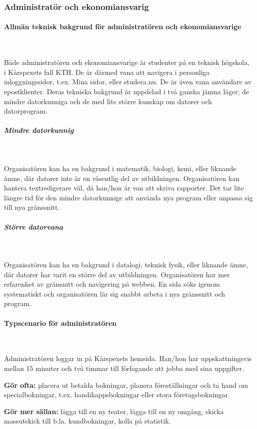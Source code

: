 \documentclass[a4paper, twoside, 11pt, titlepage]{article}
\begin{document}
		\subsubsection{Administratör och ekonomiansvarig}



			\paragraph{Allmän teknisk bakgrund för administratören och ekonomiansvarige}\

			Både administratören och ekonomiansvarige är studenter på en teknisk högskola, i Kårspexets fall KTH. De är därmed vana att navigera i personliga inloggningssidor, t.ex. Mina sidor, eller studera.nu. De är även vana användare av epostklienter. Deras tekniska bakgrund är uppdelad i två ganska jämna läger; de mindre datorkunniga och de med lite större kunskap om datorer och datorprogram.

			\subparagraph{\emph{Mindre datorkunnig}}\

				Organisatören kan ha en bakgrund i matematik, biologi, kemi, eller liknande ämne, där datorer inte är en väsentlig del av utbildningen. Organisatören kan hantera textredigerare väl, då han/hon är van att skriva rapporter. Det tar lite längre tid för den mindre datorkunnige att använda nya program eller anpassa sig till nya gränssnitt.

			\subparagraph{\emph{Större datorvana}}\

				Organisatören kan ha en bakgrund i datalogi, teknisk fysik, eller liknande ämne, där datorer har varit en större del av utbildningen. Organisatören har mer erfarenhet av gränsnitt och navigering på webben. En sida söks igenom systematiskt och organisatören lär sig snabbt arbeta i nya gränssnitt och program.

			\paragraph{Typscenario för administratören}\

			Administratören loggar in på Kårspexets hemsida. Han/hon har uppskattningsvis mellan 15 minuter och två timmar till förfogande att jobba med sina uppgifter. 

			\textbf{Gör ofta:} placera ut betalda bokningar, planera föreställningar och ta hand om specialbokningar, t.ex. handikappsbokningar eller stora företagsbokningar. 

			\textbf{Gör mer sällan:} lägga till en ny teater, lägga till en ny omgång, skicka massutskick till b.la. kundbokningar, kolla på statistik.
\end{document}
